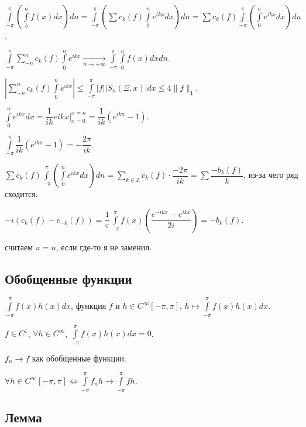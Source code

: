 \documentclass{article}
\begin{document}
        $\int\limits^{\pi}_{-\pi} \left( \int\limits^a_b f(x) dx \right) dn = \int\limits^{\pi}_{-\pi} \left( \sum c_k(f) \int\limits^n_0 e^{ikx} dx \right) dn = \sum c_k(f) \int\limits^{\pi}_{-\pi} \left( \int\limits^n_0 e^{ikx} dx \right) du$.
    
        $\int\limits^{\pi}_{-\pi} \sum\limits^n_{-n} c_k(f) \int\limits^n_0 e^{ikx} \xrightarrow[n \rightarrow +\infty]{} \int\limits^{\pi}_{-\pi} \int\limits^n_0 f(x) dx dn$.
        
        $\left| \sum\limits^n_{-n} c_k(f) \int\limits^n_0 e^{ikx} \right| \leqslant \int\limits^{\pi}_{-\pi} |f| \left| S_n(\Xi, x) \right| dx \leqslant 4 \| f \|_1$.
        
        $\int\limits^n_0 e^{ikx} dx = \dfrac{1}{ik} e{ikx} \bigg|^{x = n}_{x = 0} = \dfrac{1}{ik} (e^{ikn} - 1)$.
        
        $\int\limits^{\pi}_{-\pi} \dfrac{1}{ik} (e^{ikn} - 1) = -\dfrac{2 \pi}{i k}$.
        
        $\sum c_k(f) \int\limits^{\pi}_{-\pi} \left( \int\limits^n_0 e^{ikx} dx \right) dn = \sum\limits_{k \in \mathbb{Z}} c_k(f) \cdot \dfrac{-2 \pi}{ik} = \sum \dfrac{-b_k(f)}{k}$, из-за чего ряд сходится.
        
        $-i (c_k(f) - c_{-k}(f)) = \dfrac{1}{\pi} \int\limits^{\pi}_{-\pi} f(x) \left( \dfrac{e^{-ikx} - e^{ikx}}{2i} \right) = -b_k(f)$.
        
        считаем $u = n$, если где-то я не заменил.
        
    \subsection{Обобщенные функции}
    
        $\int\limits^{\pi}_{-\pi} f(x) h(x) dx$, функция $f$ и $h \in C^{\infty} [-\pi, \pi]$, $h \mapsto \int\limits^{\pi}_{-\pi} f(x) h(x) dx$.
        
        $f \in C^1$, $\forall h \in C^{\infty}$, $\int\limits^{\pi}_{-\pi} f(x) h(x) dx = 0$.
        
        $f_n \rightarrow f$ как обобщенные функции.
        
        $\forall h \in C^{\infty} [-\pi, \pi] \Longleftrightarrow \int\limits^{\pi}_{-\pi} f_n h \rightarrow \int\limits^{\pi}_{-\pi} fh$.
        
    \subsection{Лемма}
    
\end{document}
